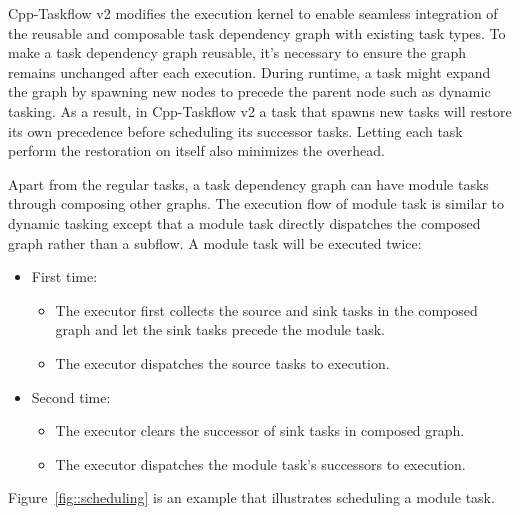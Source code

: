 \documentclass[conference]{IEEEtran}
\begin{document}
Cpp-Taskflow v2 modifies the execution kernel
to enable seamless integration of the reusable and composable task dependency graph with existing task types.
To make a task dependency graph reusable, it's necessary to ensure the
graph remains unchanged after each execution.  
During runtime, a task might expand the graph by spawning
new nodes to precede the parent node such as dynamic tasking.
As a result, in Cpp-Taskflow v2 a task that spawns new tasks will restore its own
precedence before scheduling its successor tasks.  
Letting each task perform the restoration on itself also minimizes the overhead. 

Apart from the regular tasks, a task dependency graph can have module tasks through
composing other graphs.  The execution flow of module task is similar 
to dynamic tasking except that a module task directly dispatches the composed graph rather 
than a subflow.
A module task will be executed twice: 
\begin{itemize}[leftmargin=*]
  \item First time:
    \begin{itemize}
      \item The executor first collects the source and sink tasks in the composed graph and  
        let the sink tasks precede the module task.
      \item The executor dispatches the source tasks to execution. 
    \end{itemize}
  \item Second time:
    \begin{itemize}
      \item The executor clears the successor of sink tasks in composed graph. 
      \item The executor dispatches the module task's successors to execution.
    \end{itemize}
\end{itemize}
Figure~\ref{fig::scheduling} is an example that illustrates scheduling a module task.
\end{document}
